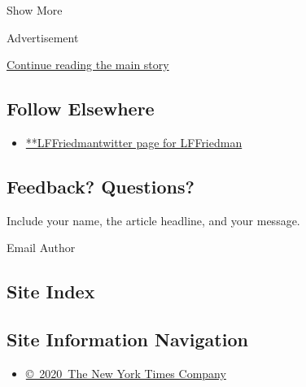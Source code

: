 Show More

Advertisement

\protect\hyperlink{after-mid2}{Continue reading the main story}

\hypertarget{follow-elsewhere}{%
\subsection{Follow Elsewhere}\label{follow-elsewhere}}

\begin{itemize}
\tightlist
\item
  \href{https://twitter.com/LFFriedman}{**LFFriedmantwitter page for
  LFFriedman}
\end{itemize}

\hypertarget{feedback-questions}{%
\subsection{Feedback? Questions?}\label{feedback-questions}}

Include your name, the article headline, and your message.

Email Author

\hypertarget{site-index}{%
\subsection{Site Index}\label{site-index}}

\hypertarget{site-information-navigation}{%
\subsection{Site Information
Navigation}\label{site-information-navigation}}

\begin{itemize}
\tightlist
\item
  \href{https://help.nytimes.com/hc/en-us/articles/115014792127-Copyright-notice}{©~2020~The
  New York Times Company}
\end{itemize}

